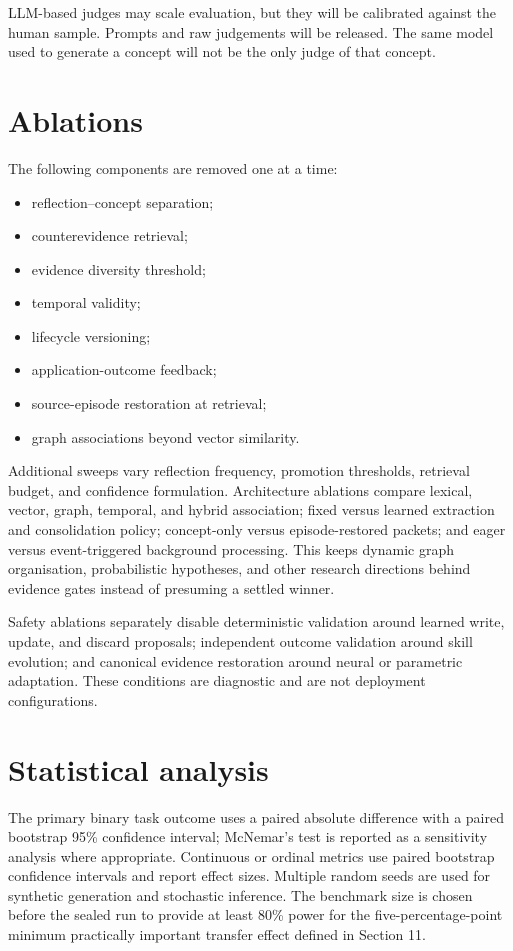 \documentclass[
  english,
  a4paper,
  DIV=11,
  numbers=noendperiod]{scrreprt}
\providecommand{\tightlist}{%
  \setlength{\itemsep}{0pt}\setlength{\parskip}{0pt}}
\begin{document}
LLM-based judges may scale evaluation, but they will be calibrated
against the human sample. Prompts and raw judgements will be released.
The same model used to generate a concept will not be the only judge of
that concept.

\section{Ablations}\label{ablations}

The following components are removed one at a time:

\begin{itemize}
\tightlist
\item
  reflection--concept separation;
\item
  counterevidence retrieval;
\item
  evidence diversity threshold;
\item
  temporal validity;
\item
  lifecycle versioning;
\item
  application-outcome feedback;
\item
  source-episode restoration at retrieval;
\item
  graph associations beyond vector similarity.
\end{itemize}

Additional sweeps vary reflection frequency, promotion thresholds,
retrieval budget, and confidence formulation. Architecture ablations
compare lexical, vector, graph, temporal, and hybrid association; fixed
versus learned extraction and consolidation policy; concept-only versus
episode-restored packets; and eager versus event-triggered background
processing. This keeps dynamic graph organisation, probabilistic
hypotheses, and other research directions behind evidence gates instead
of presuming a settled winner.

Safety ablations separately disable deterministic validation around
learned write, update, and discard proposals; independent outcome
validation around skill evolution; and canonical evidence restoration
around neural or parametric adaptation. These conditions are diagnostic
and are not deployment configurations.

\section{Statistical analysis}\label{statistical-analysis}

The primary binary task outcome uses a paired absolute difference with a
paired bootstrap 95\% confidence interval; McNemar's test is reported as
a sensitivity analysis where appropriate. Continuous or ordinal metrics
use paired bootstrap confidence intervals and report effect sizes.
Multiple random seeds are used for synthetic generation and stochastic
inference. The benchmark size is chosen before the sealed run to provide
at least 80\% power for the five-percentage-point minimum practically
important transfer effect defined in Section 11.
\end{document}
